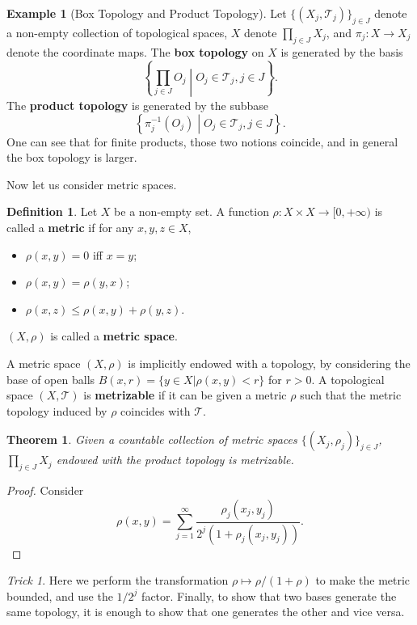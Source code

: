 \documentclass[openany]{book}
\newtheorem{theorem}{Theorem}[chapter]
\theoremstyle{definition}
\newtheorem{definition}{Definition}[chapter]
\newtheorem{example}{Example}[chapter]
\theoremstyle{remark}
\newtheorem*{trick}{Trick}
\begin{document}
\begin{example}[Box Topology and Product Topology]
    Let $\{(X_j,\mathcal{T}_j)\}_{j\in J}$ denote a non-empty collection of topological spaces, $X$ denote $\prod_{j\in J}X_j$, and $\pi_j:X\to X_j$ denote the coordinate maps. The \textbf{box topology} on $X$ is generated by the basis
    \begin{equation*}
        \left\{\prod_{j\in J}O_j\middle|O_j\in \mathcal{T}_j,j\in J\right\}.
    \end{equation*}
    The \textbf{product topology} is generated by the subbase
    \begin{equation*}
        \left\{\pi_j^{-1}(O_j)\middle|O_j\in \mathcal{T}_j,j\in J\right\}.
    \end{equation*}
    One can see that for finite products, those two notions coincide, and in general the box topology is larger.
\end{example}

Now let us consider metric spaces.
\begin{definition}
    Let $X$ be a non-empty set. A function $\rho:X\times X\to[0,+\infty)$ is called a \textbf{metric} if for any $x,y,z\in X$,
    \begin{itemize}
        \item $\rho(x,y)=0$ iff $x=y$;
        \item $\rho(x,y)=\rho(y,x)$;
        \item $\rho(x,z)\le\rho(x,y)+\rho(y,z)$.
    \end{itemize}
    $(X,\rho)$ is called a \textbf{metric space}.
\end{definition}
A metric space $(X,\rho)$ is implicitly endowed with a topology, by considering the base of open balls $B(x,r)=\{y\in X|\rho(x,y)<r\}$ for $r>0$. A topological space $(X,\mathcal{T})$ is \textbf{metrizable} if it can be given a metric $\rho$ such that the metric topology induced by $\rho$ coincides with $\mathcal{T}$.
\begin{theorem}
    Given a countable collection of metric spaces $\{(X_j,\rho_j)\}_{j\in J}$, $\prod_{j\in J}X_j$ endowed with the product topology is metrizable.
\end{theorem}
\begin{proof}
    Consider
    \begin{equation}\label{eq:prodMetric}
        \rho(x,y)=\sum_{j=1}^{\infty}\frac{\rho_j(x_j,y_j)}{2^j(1+\rho_j(x_j,y_j))}.
    \end{equation}
\end{proof}
\begin{trick}
    Here we perform the transformation $\rho\mapsto\rho/(1+\rho)$ to make the metric bounded, and use the $1/2^j$ factor. Finally, to show that two bases generate the same topology, it is enough to show that one generates the other and vice versa.
\end{trick}
\end{document}
